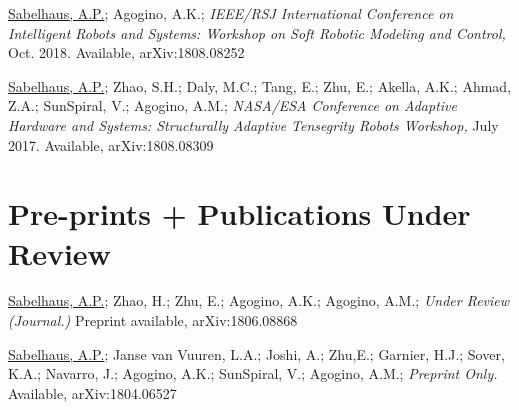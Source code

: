 \documentclass[letterpaper]{deedy-resume} %
\begin{document}
{\vspace{0.2cm}

\begin{etaremune}

\item {} \underline{Sabelhaus, A.P.}; Agogino, A.K.; {\it IEEE/RSJ International Conference on Intelligent Robots and Systems: Workshop on Soft Robotic Modeling and Control,} Oct. 2018. Available, arXiv:1808.08252

\item {} \underline{Sabelhaus, A.P.}; Zhao, S.H.; Daly, M.C.; Tang, E.; Zhu, E.; Akella, A.K.; Ahmad, Z.A.; SunSpiral, V.; Agogino, A.M.; {\it NASA/ESA Conference on Adaptive Hardware and Systems: Structurally Adaptive Tensegrity Robots Workshop,} July 2017. Available, arXiv:1808.08309
  
\end{etaremune}




\section{Pre-prints + Publications Under Review}

\vspace{0.2cm}

\begin{etaremune}
  
\item {} \underline{Sabelhaus, A.P.}; Zhao, H.; Zhu, E.; Agogino, A.K.; Agogino, A.M.; {\it Under Review (Journal.)} Preprint available, arXiv:1806.08868

\item {} \underline{Sabelhaus, A.P.}; Janse van Vuuren, L.A.; Joshi, A.; Zhu,E.; Garnier, H.J.; Sover, K.A.; Navarro, J.; Agogino, A.K.; SunSpiral, V.; Agogino, A.M.; {\it Preprint Only.} Available, arXiv:1804.06527 


\end{etaremune}}
\end{document}
